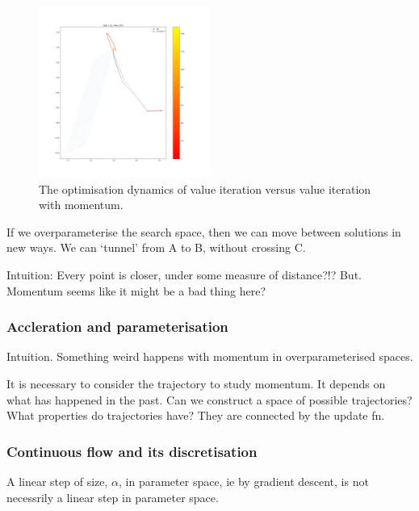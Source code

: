 \begin{figure}
\centering
\includegraphics[width=0.5\textwidth,height=0.5\textheight]{../../pictures/figures/vi_sgd-vs-vi_mom.png}
\caption{The optimisation dynamics of value iteration versus value
iteration with momentum.}
\end{figure}

If we overparameterise the search space, then we can move between
solutions in new ways. We can `tunnel' from A to B, without crossing C.

Intuition: Every point is closer, under some measure of distance?!? But.
Momentum seems like it might be a bad thing here?


\subsubsection{Accleration and parameterisation}

Intuition. Something weird happens with momentum in overparameterised
spaces.

It is necessary to consider the trajectory to study momentum. It depends
on what has happened in the past. Can we construct a space of possible
trajectories? What properties do trajectories have? They are connected
by the update fn.


\subsubsection{Continuous flow and its discretisation}

A linear step of size, \(\alpha\), in parameter space, ie by gradient
descent, is not necessrily a linear step in parameter space.

